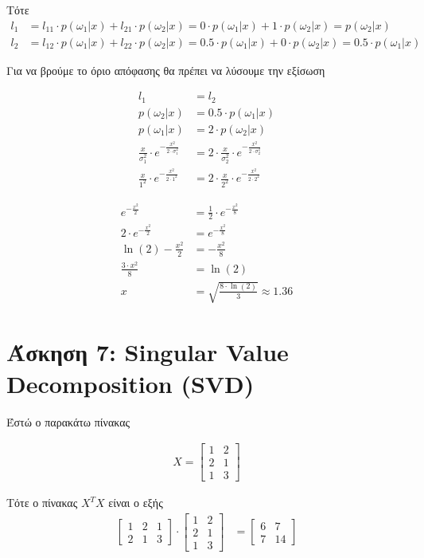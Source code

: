 \documentclass{article}
\begin{document}
	\noindent
	Tότε 
	\begin{align*}
		l_1 &= l_{11} \cdot p(ω_1 | x) + l_{21} \cdot p(ω_2 | x) = 
				0 \cdot p(ω_1 | x) + 1 \cdot p(ω_2 | x) =
				 p(ω_2 | x) \\
		l_2 &= l_{12} \cdot p(ω_1 | x) + l_{22} \cdot p(ω_2 | x) = 
				0.5 \cdot p(ω_1 | x) + 0 \cdot p(ω_2 | x) =
				0.5 \cdot p(ω_1 | x)		
	\end{align*}
	
	\noindent
	Για να βρούμε το όριο απόφασης θα πρέπει να λύσουμε την εξίσωση 
	
	\begin{align*}
		l_1 &= 	l_2 \\
		p(ω_2 | x) &= 0.5 \cdot p(ω_1 | x)	\\	
		p(ω_1 | x) &= 2 \cdot p(ω_2 | x) \\
		\frac{x}{σ_{1}^2} \cdot e^{-\frac{x ^{2}}{2 \cdot σ_{1}^{2}}} &= 2 \cdot \frac{x}{σ_{2}^2} \cdot e^{-\frac{x ^{2}}{2 \cdot σ_{2}^{2}}}\\ 
		\frac{x}{1^2} \cdot e^{-\frac{x ^{2}}{2 \cdot 1^{2}}} &= 2 \cdot \frac{x}{2^2} \cdot e^{-\frac{x ^{2}}{2 \cdot 2^{2}}}
	\end{align*}

	\pagebreak
	\begin{align*}
		e^{-\frac{x ^{2}}{2}} &= \frac{1}{2} \cdot e^{-\frac{x ^{2}}{8}} \\
		2 \cdot e^{-\frac{x ^{2}}{2}} &= e^{-\frac{x ^{2}}{8}} \\
		\ln(2) -\frac{x ^{2}}{2} &= -\frac{x ^{2}}{8} \\
		\frac{3 \cdot x ^{2}}{8} &= \ln(2) \\
		x &= \sqrt{\frac{8 \cdot \ln(2)}{3}} \approx 1.36
	\end{align*}
\section*{Άσκηση 7: Singular Value Decomposition (SVD)}
	Έστώ ο παρακάτω πίνακας
	
	\begin{align*}
		X = 
		\begin{bmatrix}
			1 & 2 \\
			2 & 1 \\
			1 & 3
		\end{bmatrix}	
	\end{align*}

	\noindent
	Tότε ο πίνακας $X^TX$ είναι ο εξής
		\begin{align*}
		\begin{bmatrix}
			1 & 2 & 1 \\
			2 & 1 & 3
		\end{bmatrix}
		\cdot
		\begin{bmatrix}
			1 & 2 \\
			2 & 1 \\
			1 & 3
		\end{bmatrix} &= 
		\begin{bmatrix}
			6 & 7 \\
			7 & 14 
		\end{bmatrix}
	\end{align*}
\end{document}
